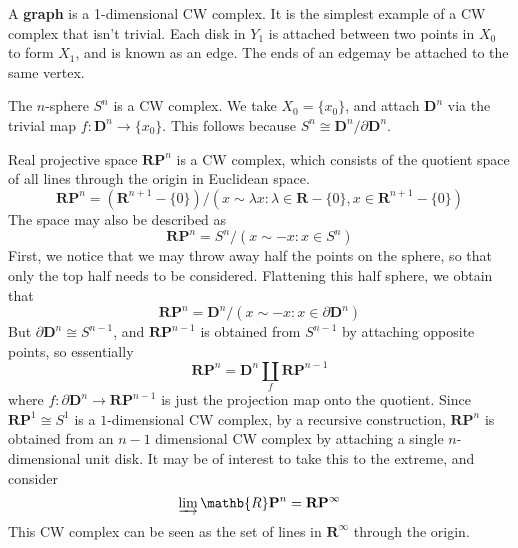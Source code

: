 \begin{example}
    A {\bf graph} is a 1-dimensional CW complex. It is the simplest example of a CW complex that isn't trivial. Each disk in $Y_1$ is attached between two points in $X_0$ to form $X_1$, and is known as an edge. The ends of an edgemay be attached to the same vertex.
\end{example}

\begin{example}
    The $n$-sphere $S^n$ is a CW complex. We take $X_0 = \{ x_0 \}$, and attach $\mathbf{D}^n$ via the trivial map $f: \mathbf{D}^n \to \{ x_0 \}$. This follows because $S^n \cong \mathbf{D}^n / \partial \mathbf{D}^n$.
\end{example}

\begin{example}
    Real projective space $\mathbf{R} \mathbf{P}^n$ is a CW complex, which consists of the quotient space of all lines through the origin in Euclidean space.
    \[ \mathbf{R} \mathbf{P}^n = (\mathbf{R}^{n+1} - \{ 0 \})/ ({x \sim \lambda x : \lambda \in \mathbf{R} - \{ 0 \}, x \in \mathbf{R}^{n+1}} - \{ 0 \}) \]
    The space may also be described as
    \[ \mathbf{R} \mathbf{P}^n = S^n / {(x \sim -x : x \in S^n)} \]
    First, we notice that we may throw away half the points on the sphere, so that only the top half needs to be considered. Flattening this half sphere, we obtain that
    \[ \mathbf{R} \mathbf{P}^n = \mathbf{D}^n / {(x \sim -x : x \in \partial \mathbf{D}^n)} \]
    But $\partial \mathbf{D}^n \cong S^{n-1}$, and $\mathbf{R} \mathbf{P}^{n-1}$ is obtained from $S^{n-1}$ by attaching opposite points, so essentially
    \[ \mathbf{R} \mathbf{P}^n = \mathbf{D}^n \coprod_f \mathbf{R} \mathbf{P}^{n-1} \]
    where $f: \partial \mathbf{D}^n \to \mathbf{R} \mathbf{P}^{n-1}$ is just the projection map onto the quotient. Since $\mathbf{R} \mathbf{P}^1 \cong S^1$ is a $1$-dimensional CW complex, by a recursive construction, $\mathbf{R} \mathbf{P}^n$ is obtained from an $n-1$ dimensional CW complex by attaching a single $n$-dimensional unit disk. It may be of interest to take this to the extreme, and consider
    \[ \varinjlim \mathb{R} \mathbf{P}^n = \mathbf{R} \mathbf{P}^\infty \]
    This CW complex can be seen as the set of lines in $\mathbf{R}^\infty$ through the origin.
\end{example}

